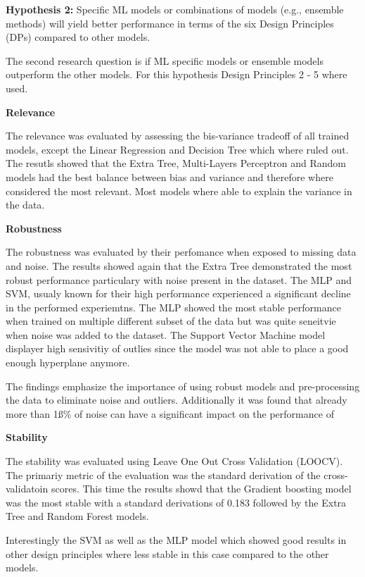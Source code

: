 \textbf{Hypothesis 2:} Specific ML models or combinations of models (e.g., ensemble methods) will yield better
performance
in terms of the six Design Principles (DPs) compared to other models.

The second research question is if \ac{ML} specific models or ensemble models outperform the other models.
For this hypothesis Design Principles 2 - 5 where used.

\textbf{Relevance}

The relevance was evaluated by assessing the bis-variance tradeoff of all trained models, except the Linear Regression
and Decision Tree which where ruled out.
The resutls showed that the Extra Tree, Multi-Layers Perceptron and Random models had the best balance between
bias and variance and therefore where considered the most relevant.
Most models where able to explain the variance in the data.


\textbf{Robustness}

The robustness was evaluated by their perfomance when exposed to missing data and noise.
The results showed again that the Extra Tree demonstrated the most robust performance particulary with noise present
in the dataset.
The MLP and SVM, usualy known for their high performance experienced a significant decline in the performed
experiemtns.
The MLP showed the most stable performance when trained on multiple different subset of the data but was quite
seneitvie when noise was added to the dataset.
The Support Vector Machine model displayer high sensivitiy of outlies since the model was not able to place a good
enough hyperplane anymore.

The findings emphasize the importance of using robust models and pre-processing the data to eliminate noise and
outliers.
Additionally it was found that already more than 1ß\% of noise can have a significant impact on the performance of

\textbf{Stability}

The stability was evaluated using Leave One Out Cross Validation (LOOCV).
The primariy metric of the evaluation was the standard derivation of the cross-validatoin scores.
This time the results showd that the Gradient boosting model was the most stable with a standard
derivations of 0.183 followed by the Extra Tree and Random Forest models.

Interestingly the SVM as well as the MLP model which showed good results in other design principles where less stable
in this case compared to the other models.

